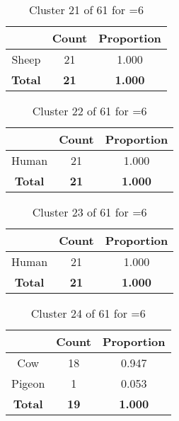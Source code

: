 \begin{table}[ht!]
\centering
\begin{tabular}{|c|c|c|}
\hline
\bf \Spec{} &\bf Count &\bf Proportion\\ \hline \hline
Sheep & 21 & 1.000\\ \hline
\hline
\bf Total & \bf 21 & \bf 1.000\\ \hline
\end{tabular}
\label{tab:cluster:21:6}
\caption{Cluster 21 of 61 for \minneigh{}=6}
\end{table}

\begin{table}[ht!]
\centering
\begin{tabular}{|c|c|c|}
\hline
\bf \Spec{} &\bf Count &\bf Proportion\\ \hline \hline
Human & 21 & 1.000\\ \hline
\hline
\bf Total & \bf 21 & \bf 1.000\\ \hline
\end{tabular}
\label{tab:cluster:22:6}
\caption{Cluster 22 of 61 for \minneigh{}=6}
\end{table}

\begin{table}[ht!]
\centering
\begin{tabular}{|c|c|c|}
\hline
\bf \Spec{} &\bf Count &\bf Proportion\\ \hline \hline
Human & 21 & 1.000\\ \hline
\hline
\bf Total & \bf 21 & \bf 1.000\\ \hline
\end{tabular}
\label{tab:cluster:23:6}
\caption{Cluster 23 of 61 for \minneigh{}=6}
\end{table}

\begin{table}[ht!]
\centering
\begin{tabular}{|c|c|c|}
\hline
\bf \Spec{} &\bf Count &\bf Proportion\\ \hline \hline
Cow & 18 & 0.947\\ \hline
Pigeon & 1 & 0.053\\ \hline
\hline
\bf Total & \bf 19 & \bf 1.000\\ \hline
\end{tabular}
\label{tab:cluster:24:6}
\caption{Cluster 24 of 61 for \minneigh{}=6}
\end{table}


